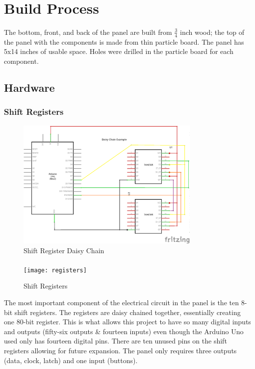 \documentclass[12pt,a4paper]{article}
\begin{document}
\section{Build Process}
\paragraph{}
The bottom, front, and back of the panel are built from \(\frac{3}{4}\)  inch wood; the top of the panel with the components is made from thin particle board. The panel has 5x14 inches of usable space. Holes were drilled in the particle board for each component.
\newpage
\subsection{Hardware}
\subsubsection{Shift Registers}
\begin{figure}[!h]
	\centering
	\includegraphics[width=0.8\textwidth]{daisy_chain}
	\caption{Shift Register Daisy Chain}
	\label{fig:daisy_chain}
\end{figure}
\paragraph{}
\begin{figure}
	\vspace*{-0.5cm}
	\centering
	\texttt{[image: registers]}
	\caption{Shift Registers}
	\label{fig:circuit}
\end{figure}
The most important component of the electrical circuit in the panel is the ten 8-bit shift registers. The registers are daisy chained together, essentially creating one 80-bit register. This is what allows this project to have so many digital inputs and outputs (fifty-six outputs \& fourteen inputs) even though the Arduino Uno used only has fourteen digital pins. There are ten unused pins on the shift registers allowing for future expansion. The panel only requires three outputs (data, clock, latch) and one input (buttons).
\end{document}
